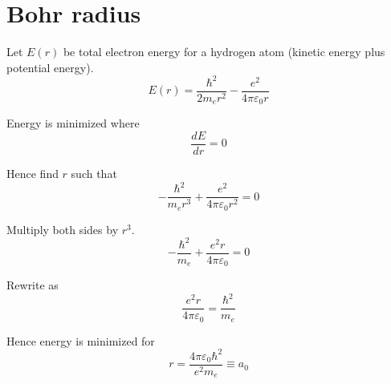 

\section*{Bohr radius}

Let $E(r)$ be total electron energy for a hydrogen atom (kinetic energy plus potential energy).
\begin{equation*}
E(r)=\frac{\hbar^2}{2m_er^2}-\frac{e^2}{4\pi\varepsilon_0r}
\end{equation*}

Energy is minimized where
\begin{equation*}
\frac{dE}{dr}=0
\end{equation*}

Hence find $r$ such that
\begin{equation*}
-\frac{\hbar^2}{m_er^3}+\frac{e^2}{4\pi\varepsilon_0r^2}=0
\end{equation*}

Multiply both sides by $r^3$.
\begin{equation*}
-\frac{\hbar^2}{m_e}+\frac{e^2r}{4\pi\varepsilon_0}=0
\end{equation*}

Rewrite as
\begin{equation*}
\frac{e^2r}{4\pi\varepsilon_0}=\frac{\hbar^2}{m_e}
\end{equation*}

Hence energy is minimized for
\begin{equation*}
r=\frac{4\pi\varepsilon_0\hbar^2}{e^2m_e}\equiv a_0
\end{equation*}


